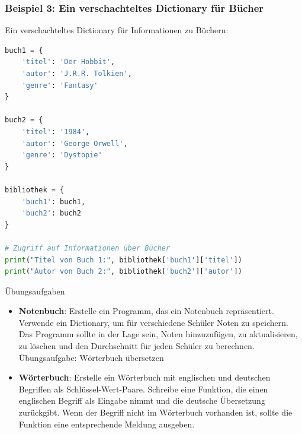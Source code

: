 \subsubsection*{Beispiel 3: Ein verschachteltes Dictionary für Bücher}

Ein verschachteltes Dictionary für Informationen zu Büchern:

\begin{lstlisting}[language=Python]
buch1 = {
    'titel': 'Der Hobbit',
    'autor': 'J.R.R. Tolkien',
    'genre': 'Fantasy'
}

buch2 = {
    'titel': '1984',
    'autor': 'George Orwell',
    'genre': 'Dystopie'
}

bibliothek = {
    'buch1': buch1,
    'buch2': buch2
}

# Zugriff auf Informationen über Bücher
print("Titel von Buch 1:", bibliothek['buch1']['titel'])
print("Autor von Buch 2:", bibliothek['buch2']['autor'])
\end{lstlisting}



Übungsaufgaben
\begin{itemize}
\item \textbf{Notenbuch}: Erstelle ein Programm, das ein Notenbuch repräsentiert. Verwende ein Dictionary, um für verschiedene Schüler Noten zu speichern. Das Programm sollte in der Lage sein, Noten hinzuzufügen, zu aktualisieren, zu löschen und den Durchschnitt für jeden Schüler zu berechnen.
Übungsaufgabe: Wörterbuch übersetzen
\item \textbf{Wörterbuch}: Erstelle ein Wörterbuch mit englischen und deutschen Begriffen als Schlüssel-Wert-Paare. Schreibe eine Funktion, die einen englischen Begriff als Eingabe nimmt und die deutsche Übersetzung zurückgibt. Wenn der Begriff nicht im Wörterbuch vorhanden ist, sollte die Funktion eine entsprechende Meldung ausgeben.
\end{itemize}